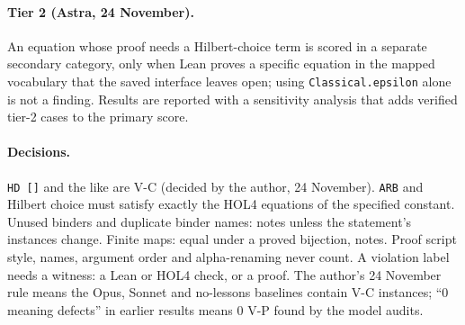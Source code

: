 \documentclass[11pt,a4paper]{article}
\newcommand{\code}[1]{\texttt{#1}}
\begin{document}
\paragraph{Tier 2 (Astra, 24 November).} An equation whose proof needs a Hilbert-choice term is scored in a separate secondary category, only when Lean proves a specific equation in the mapped vocabulary that the saved interface leaves open; using \code{Classical.epsilon} alone is not a finding. Results are reported with a sensitivity analysis that adds verified tier-2 cases to the primary score.
\paragraph{Decisions.} \code{HD []} and the like are V-C (decided by the author, 24 November). \code{ARB} and Hilbert choice must satisfy exactly the HOL4 equations of the specified constant. Unused binders and duplicate binder names: notes unless the statement's instances change. Finite maps: equal under a proved bijection, notes. Proof script style, names, argument order and alpha-renaming never count. A violation label needs a witness: a Lean or HOL4 check, or a proof. The author's 24 November rule means the Opus, Sonnet and no-lessons baselines contain V-C instances; ``0 meaning defects'' in earlier results means 0 V-P found by the model audits.
\end{document}
